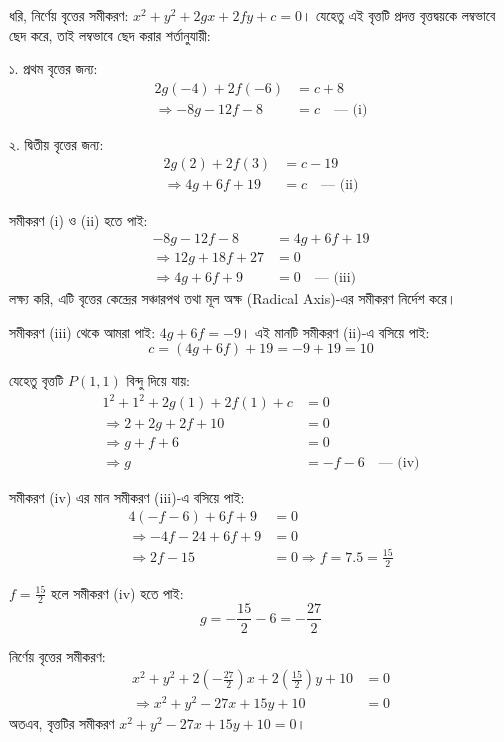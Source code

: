 \documentclass[12pt, a4paper]{article}
\begin{document}
\begin{tcolorbox}[solutionbox={সমাধান (Solution)}]
    \noindent
    ধরি, নির্ণেয় বৃত্তের সমীকরণ: $x^2 + y^2 + 2gx + 2fy + c = 0$। 
    যেহেতু এই বৃত্তটি প্রদত্ত বৃত্তদ্বয়কে লম্বভাবে ছেদ করে, তাই লম্বভাবে ছেদ করার শর্তানুযায়ী:
    
    ১. প্রথম বৃত্তের জন্য: 
    \begin{align*}
        2g(-4) + 2f(-6) &= c + 8 \\
        \Rightarrow -8g - 12f - 8 &= c \quad \text{--- (i)}
    \end{align*}
    
    ২. দ্বিতীয় বৃত্তের জন্য: 
    \begin{align*}
        2g(2) + 2f(3) &= c - 19 \\
        \Rightarrow 4g + 6f + 19 &= c \quad \text{--- (ii)}
    \end{align*}
    
    সমীকরণ (i) ও (ii) হতে পাই: 
    \begin{align*}
        -8g - 12f - 8 &= 4g + 6f + 19 \\
        \Rightarrow 12g + 18f + 27 &= 0 \\
        \Rightarrow 4g + 6f + 9 &= 0 \quad \text{--- (iii)}
    \end{align*}
    লক্ষ্য করি, এটি বৃত্তের কেন্দ্রের সঞ্চারপথ তথা মূল অক্ষ (Radical Axis)-এর সমীকরণ নির্দেশ করে। 
    
    সমীকরণ (iii) থেকে আমরা পাই: $4g + 6f = -9$। 
    এই মানটি সমীকরণ (ii)-এ বসিয়ে পাই: 
    \[ c = (4g + 6f) + 19 = -9 + 19 = 10 \]
    
    যেহেতু বৃত্তটি $P(1, 1)$ বিন্দু দিয়ে যায়:
    \begin{align*}
        1^2 + 1^2 + 2g(1) + 2f(1) + c &= 0 \\
        \Rightarrow 2 + 2g + 2f + 10 &= 0 \\
        \Rightarrow g + f + 6 &= 0 \\
        \Rightarrow g &= -f - 6 \quad \text{--- (iv)}
    \end{align*}
    
    সমীকরণ (iv) এর মান সমীকরণ (iii)-এ বসিয়ে পাই:
    \begin{align*}
        4(-f - 6) + 6f + 9 &= 0 \\
        \Rightarrow -4f - 24 + 6f + 9 &= 0 \\
        \Rightarrow 2f - 15 &= 0 \Rightarrow f = 7.5 = \frac{15}{2}
    \end{align*}
    
    $f = \frac{15}{2}$ হলে সমীকরণ (iv) হতে পাই:
    \[ g = -\frac{15}{2} - 6 = -\frac{27}{2} \]
    
    নির্ণেয় বৃত্তের সমীকরণ: 
    \begin{align*}
        x^2 + y^2 + 2\left(-\frac{27}{2}\right)x + 2\left(\frac{15}{2}\right)y + 10 &= 0 \\
        \Rightarrow x^2 + y^2 - 27x + 15y + 10 &= 0
    \end{align*}
    অতএব, বৃত্তটির সমীকরণ \textbf{$x^2 + y^2 - 27x + 15y + 10 = 0$}।
\end{tcolorbox}
\end{document}
